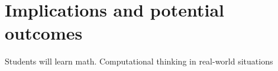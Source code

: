 \section{Implications and potential outcomes}




Students will learn math.
Computational thinking in real-world situations
